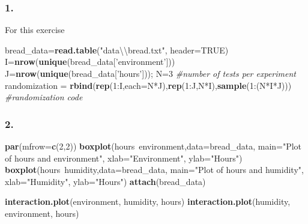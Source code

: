 \documentclass[11pt,]{article}
\newenvironment{Shaded}{\begin{snugshade}}{\end{snugshade}}
\newcommand{\KeywordTok}[1]{\textcolor[rgb]{0.13,0.29,0.53}{\textbf{{#1}}}}
\newcommand{\DataTypeTok}[1]{\textcolor[rgb]{0.13,0.29,0.53}{{#1}}}
\newcommand{\DecValTok}[1]{\textcolor[rgb]{0.00,0.00,0.81}{{#1}}}
\newcommand{\CharTok}[1]{\textcolor[rgb]{0.31,0.60,0.02}{{#1}}}
\newcommand{\StringTok}[1]{\textcolor[rgb]{0.31,0.60,0.02}{{#1}}}
\newcommand{\CommentTok}[1]{\textcolor[rgb]{0.56,0.35,0.01}{\textit{{#1}}}}
\newcommand{\OtherTok}[1]{\textcolor[rgb]{0.56,0.35,0.01}{{#1}}}
\newcommand{\NormalTok}[1]{{#1}}
\begin{document}
\subsubsection{1.}\label{section}

For this exercise

\begin{Shaded}
\begin{Highlighting}[]
\NormalTok{bread_data=}\KeywordTok{read.table}\NormalTok{(}\StringTok{"data}\CharTok{\textbackslash{}\textbackslash{}}\StringTok{bread.txt"}\NormalTok{, }\DataTypeTok{header=}\OtherTok{TRUE}\NormalTok{)}
\NormalTok{I=}\KeywordTok{nrow}\NormalTok{(}\KeywordTok{unique}\NormalTok{(bread_data[}\StringTok{'environment'}\NormalTok{]))}
\NormalTok{J=}\KeywordTok{nrow}\NormalTok{(}\KeywordTok{unique}\NormalTok{(bread_data[}\StringTok{'hours'}\NormalTok{]));}
\NormalTok{N=}\DecValTok{3} \CommentTok{#number of tests per experiment}
\NormalTok{randomization =}\StringTok{ }\KeywordTok{rbind}\NormalTok{(}\KeywordTok{rep}\NormalTok{(}\DecValTok{1}\NormalTok{:I,}\DataTypeTok{each=}\NormalTok{N*J),}\KeywordTok{rep}\NormalTok{(}\DecValTok{1}\NormalTok{:J,N*I),}\KeywordTok{sample}\NormalTok{(}\DecValTok{1}\NormalTok{:(N*I*J))) }\CommentTok{#randomization code}
\end{Highlighting}
\end{Shaded}

\subsubsection{2.}\label{section-1}

\begin{Shaded}
\begin{Highlighting}[]
\KeywordTok{par}\NormalTok{(}\DataTypeTok{mfrow=}\KeywordTok{c}\NormalTok{(}\DecValTok{2}\NormalTok{,}\DecValTok{2}\NormalTok{))}
\KeywordTok{boxplot}\NormalTok{(hours~environment,}\DataTypeTok{data=}\NormalTok{bread_data, }\DataTypeTok{main=}\StringTok{"Plot of hours and environment"}\NormalTok{, }
    \DataTypeTok{xlab=}\StringTok{"Environment"}\NormalTok{, }\DataTypeTok{ylab=}\StringTok{"Hours"}\NormalTok{)}
\KeywordTok{boxplot}\NormalTok{(hours~humidity,}\DataTypeTok{data=}\NormalTok{bread_data, }\DataTypeTok{main=}\StringTok{"Plot of hours and humidity"}\NormalTok{, }
    \DataTypeTok{xlab=}\StringTok{"Humidity"}\NormalTok{, }\DataTypeTok{ylab=}\StringTok{"Hours"}\NormalTok{)}
\KeywordTok{attach}\NormalTok{(bread_data)}

\KeywordTok{interaction.plot}\NormalTok{(environment, humidity, hours)}
\KeywordTok{interaction.plot}\NormalTok{(humidity, environment, hours)}
\end{Highlighting}
\end{Shaded}
\end{document}
